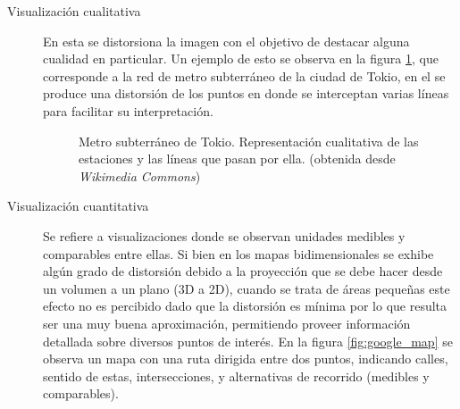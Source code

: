 \documentclass[12pt]{article}
\begin{document}
	\begin{description}		
		\item[Visualización cualitativa] En esta se distorsiona la imagen con el objetivo de destacar alguna cualidad en particular. Un ejemplo de esto se observa en la figura \ref{fig:metro}, que corresponde a la red de metro subterráneo de la ciudad de Tokio, en el se produce una distorsión de los puntos en donde se interceptan varias líneas para facilitar su interpretación. 
		
\begin{figure}[h] %
\caption[Metro subterráneo de Tokio]{Metro subterráneo de Tokio. Representación cualitativa de las estaciones y las líneas que pasan por ella. (obtenida desde \textit{Wikimedia Commons})}
\label{fig:metro}
\end{figure}

		\item[Visualización cuantitativa] Se refiere a visualizaciones donde se observan unidades medibles y comparables entre ellas. Si bien en los mapas bidimensionales se exhibe algún grado de distorsión debido a la proyección que se debe hacer desde un volumen a un plano (3D a 2D), cuando se trata de áreas pequeñas este efecto no es percibido dado que la distorsión es mínima por lo que resulta ser una muy buena aproximación, permitiendo proveer información detallada sobre diversos puntos de interés. En la figura \ref{fig:google_map} se observa un mapa con una ruta dirigida entre dos puntos, indicando calles, sentido de estas, intersecciones, y alternativas de recorrido (medibles y comparables).
		

\end{description}
\end{document}
